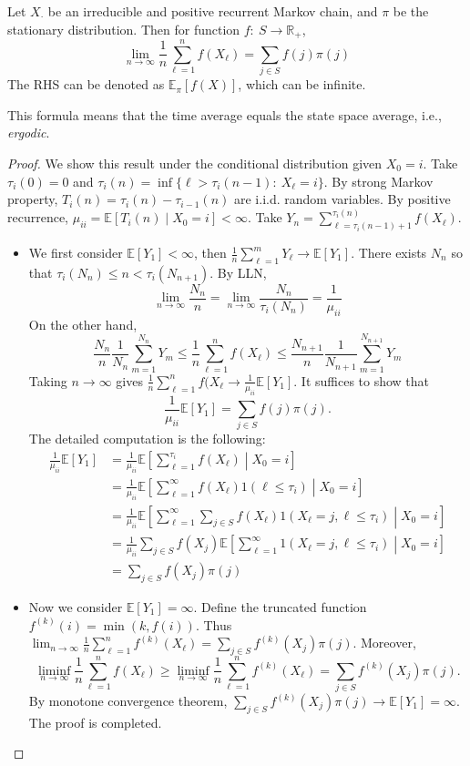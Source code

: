 \begin{theorem}
Let $X_{\cdot}$ be an irreducible and positive recurrent Markov chain, and $\pi$ be the stationary distribution.
Then for function $f:~S\to\mathbb{R}_+$, 
\[
\lim_{n\to\infty}\frac{1}{n}\sum_{\ell=1}^nf(X_{\ell})=\sum_{j\in S}f(j)\pi(j)
\]
The RHS can be denoted as $\mathbb{E}_{\pi}[f(X)]$, which can be infinite.
\end{theorem}
This formula means that the time average equals the state space average, i.e., \emph{ergodic}.

\begin{proof}
We show this result under the conditional distribution given $X_0=i$.
Take $\tau_i(0)=0$ and $\tau_i(n)=\inf\{\ell>\tau_i(n-1):~X_{\ell}=i\}$.
By strong Markov property, $T_i(n)=\tau_i(n)-\tau_{i-1}(n)$ are i.i.d. random variables.
By positive recurrence, $\mu_{ii}=\mathbb{E}[T_i(n)\mid X_0=i]<\infty$.
Take $Y_n=\sum_{\ell=\tau_i(n-1)+1}^{\tau_i(n)}f(X_{\ell})$.
\begin{itemize}
\item
We first consider $\mathbb{E}[Y_1]<\infty$, then $\frac{1}{n}\sum_{\ell=1}^mY_{\ell}\to\mathbb{E}[Y_1]$.
There exists $N_n$ so that $\tau_i(N_n)\le n<\tau_i(N_{n+1})$. By LLN,
\[
\lim_{n\to\infty}\frac{N_n}{n}=\lim_{n\to\infty}\frac{N_n}{\tau_i(N_n)}=\frac{1}{\mu_{ii}}
\]
On the other hand, 
\[
\frac{N_n}{n}\frac{1}{N_n}\sum_{m=1}^{N_n}Y_{m}\le 
\frac{1}{n}\sum_{\ell=1}^nf(X_{\ell})
\le \frac{N_{n+1}}{n}\frac{1}{N_{n+1}}\sum_{m=1}^{N_{n+1}}Y_{m}
\]
Taking $n\to\infty$ gives $\frac{1}{n}\sum_{\ell=1}^nf(X_{\ell}\to\frac{1}{\mu_{ii}}\mathbb{E}[Y_1]$.
It suffices to show that 
\[
\frac{1}{\mu_{ii}}\mathbb{E}[Y_1]=\sum_{j\in S}f(j)\pi(j).
\]
The detailed computation is the following:
\begin{align*}
\frac{1}{\mu_{ii}}\mathbb{E}[Y_1]&=\frac{1}{\mu_{ii}}\mathbb{E}\left[
\sum_{\ell=1}^{\tau_i}f(X_{\ell})\middle|X_0=i
\right]\\
&=\frac{1}{\mu_{ii}}\mathbb{E}\left[
\sum_{\ell=1}^{\infty}f(X_{\ell})1(\ell\le\tau_i)\middle|X_0=i
\right]\\
&=\frac{1}{\mu_{ii}}\mathbb{E}\left[
\sum_{\ell=1}^{\infty}\sum_{j\in S}f(X_{\ell})1(X_{\ell}=j, \ell\le\tau_i)\middle|X_0=i
\right]\\
&=\frac{1}{\mu_{ii}}\sum_{j\in S}f(X_{j})\mathbb{E}\left[
\sum_{\ell=1}^{\infty}1(X_{\ell}=j, \ell\le\tau_i)\middle|X_0=i
\right]\\
&=\sum_{j\in S}f(X_{j})\pi(j)
\end{align*}
\item
Now we consider $\mathbb{E}[Y_1]=\infty$.
Define the truncated function $f^{(k)}(i)=\min(k, f(i))$.
Thus $\lim_{n\to\infty}\frac{1}{n}\sum_{\ell=1}^nf^{(k)}(X_{\ell})=\sum_{j\in S}f^{(k)}(X_{j})\pi(j)$.
Moreover,
\[
\liminf_{n\to\infty}\frac{1}{n}\sum_{\ell=1}^nf(X_{\ell})\ge
\liminf_{n\to\infty}\frac{1}{n}\sum_{\ell=1}^nf^{(k)}(X_{\ell})=\sum_{j\in S}f^{(k)}(X_{j})\pi(j).
\]
By monotone convergence theorem, $\sum_{j\in S}f^{(k)}(X_{j})\pi(j)\to\mathbb{E}[Y_1]=\infty$.
The proof is completed.
\end{itemize}

\end{proof}

